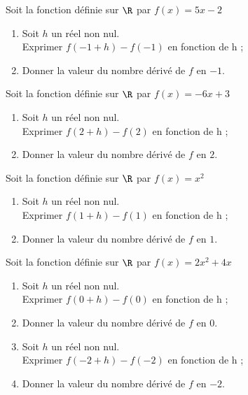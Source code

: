 \documentclass[11pt]{article}
\begin{document}
\begin{exercice}
Soit la fonction définie sur $\R$ par $f(x)=5x-2$
\begin{enumerate}
\item Soit $h$ un réel non nul. \\
Exprimer $f(-1+h)-f(-1)$ en fonction de h ;
\item Donner la valeur du nombre dérivé de $f$ en $-1$.
\end{enumerate}
\end{exercice}

\begin{exercice}
Soit la fonction définie sur $\R$ par $f(x)=-6x+3$
\begin{enumerate}
\item Soit $h$ un réel non nul. \\
Exprimer $f(2+h)-f(2)$ en fonction de h ;
\item Donner la valeur du nombre dérivé de $f$ en $2$.
\end{enumerate}
\end{exercice}

\begin{exercice}
Soit la fonction définie sur $\R$ par $f(x)=x^2$
\begin{enumerate}
\item Soit $h$ un réel non nul. \\
Exprimer $f(1+h)-f(1)$ en fonction de h ;
\item Donner la valeur du nombre dérivé de $f$ en $1$.
\end{enumerate}
\end{exercice}

\begin{exercice}
Soit la fonction définie sur $\R$ par $f(x)=2x^2+4x$
\begin{enumerate}
\item Soit $h$ un réel non nul. \\
Exprimer $f(0+h)-f(0)$ en fonction de h ;
\item Donner la valeur du nombre dérivé de $f$ en $0$.
\item Soit $h$ un réel non nul. \\
Exprimer $f(-2+h)-f(-2)$ en fonction de h ;
\item Donner la valeur du nombre dérivé de $f$ en $-2$.
\end{enumerate}
\end{exercice}
\end{document}
